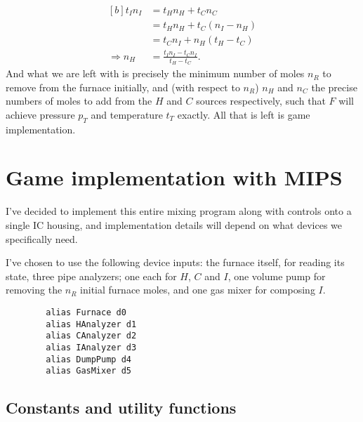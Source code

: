 \documentclass{article}
\begin{document}
\begin{equation}\label{eq:nH}
    \begin{aligned}[b]
        t_I n_I
        &= t_H n_H+t_C n_C \\
        &= t_H n_H+t_C(n_I-n_H) \\
        &= t_C n_I+n_H(t_H-t_C) \\
        \Rightarrow n_H &= \frac{t_I n_I-t_C n_I}{t_H-t_C}.
    \end{aligned}
\end{equation}
And what we are left with is precisely the minimum number of moles $n_R$ to
remove from the furnace initially, and (with respect to $n_R$) $n_H$ and $n_C$
the precise numbers of moles to add from the $H$ and $C$ sources respectively,
such that $F$ will achieve pressure $p_T$ and temperature $t_T$ exactly.
All that is left is game implementation.

\pagebreak

\section{Game implementation with MIPS}

I've decided to implement this entire mixing program along with controls onto a
single IC housing, and implementation details will depend on what devices we
specifically need.
\vspace{1em}
\begin{paracol}{2}
    \noindent
    I've chosen to use the following device inputs:
    the furnace itself, for reading its state,
    three pipe analyzers; one each for $H$, $C$ and $I$,
    one volume pump for removing the $n_R$ initial furnace moles, and
    one gas mixer for composing $I$.
    \switchcolumn
    \vspace{-1em}
    \begin{verbatim}
        alias Furnace d0
        alias HAnalyzer d1
        alias CAnalyzer d2
        alias IAnalyzer d3
        alias DumpPump d4
        alias GasMixer d5
    \end{verbatim}
\end{paracol}

\subsection{Constants and utility functions}
\end{document}
